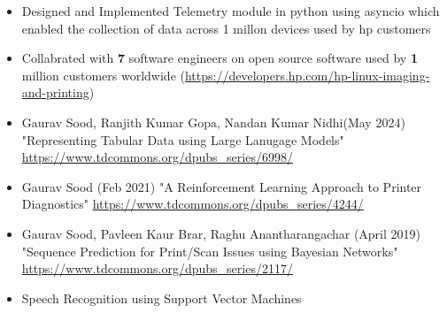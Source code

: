 \documentclass[10pt,a4paper,ragged2e,withhyper]{altacv}
\begin{document}
\begin{paracol}{1}
\par\divider
{}
\begin{itemize}
\item Designed and Implemented Telemetry module in python using asyncio which
enabled the collection of data across 1 millon devices used by hp customers
\item Collabrated with \textbf{\textbf{7}} software engineers on open source software used by \textbf{\textbf{1}}
million customers worldwide (\url{https://developers.hp.com/hp-linux-imaging-and-printing})
\end{itemize}


\label{sec:orgba35091}
\begin{itemize}
\item Gaurav Sood, Ranjith Kumar Gopa, Nandan Kumar Nidhi(May 2024) "Representing
Tabular Data using Large Lanugage Models"
\url{https://www.tdcommons.org/dpubs\_series/6998/}
\item Gaurav Sood (Feb 2021) "A Reinforcement Learning Approach to Printer Diagnostics"
\url{https://www.tdcommons.org/dpubs\_series/4244/}
\item Gaurav	Sood, Pavleen Kaur Brar, Raghu Anantharangachar (April 2019)
"Sequence Prediction for Print/Scan Issues using Bayesian Networks"
\url{https://www.tdcommons.org/dpubs\_series/2117/}
\end{itemize}

\label{sec:org3e4bf0b}
\nocite{*}
\printbibliography[heading=pubtype,title={\printinfo{\faUsers}{Conference Proceedings}},type=inproceedings]

\label{sec:org179dda5}
\begin{itemize}
\item \faBook Speech Recognition using Support Vector Machines
\end{itemize}

\divider


\end{paracol}
\end{document}
